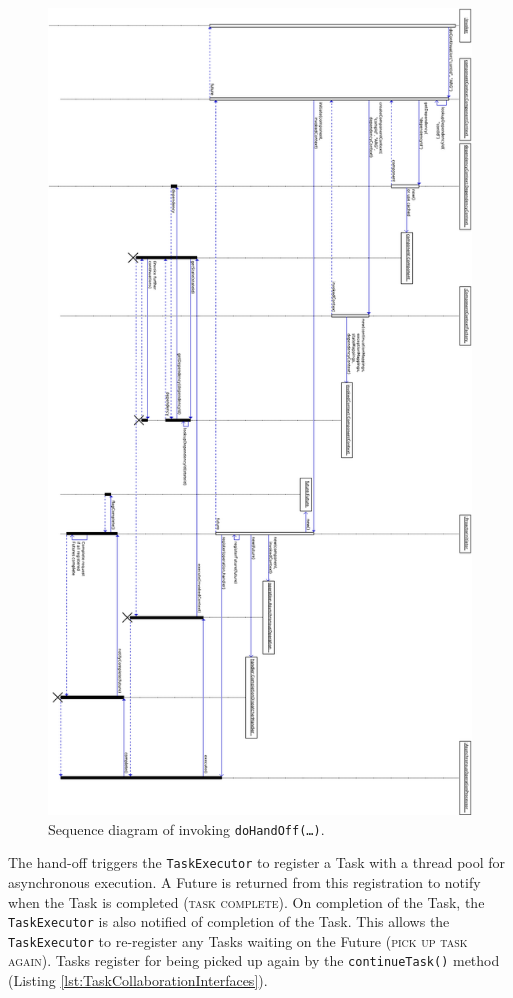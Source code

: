 \documentclass[prodmode]{style/acmlarge}
\begin{document}
\begin{figure}[!t]
\centering
\includegraphics[width=6in]{DoContinuationSequenceDiagram}
\caption{Sequence diagram of invoking \texttt{doHandOff(\ldots)}.}
\label{fig:DoContinuationSequenceDiagram}
\end{figure}

The hand-off triggers the \texttt{TaskExecutor} to register a Task with a thread
pool for asynchronous execution.  A Future is returned from this registration to
notify when the Task is completed (\textsc{task complete}).  On completion of
the Task, the \texttt{TaskExecutor} is also notified of completion of the Task.
This allows the \texttt{TaskExecutor} to re-register any Tasks waiting on the
Future (\textsc{pick up task again}).  Tasks register for being picked up again
by the \texttt{continueTask()} method (Listing
\ref{lst:TaskCollaborationInterfaces}).
\end{document}
